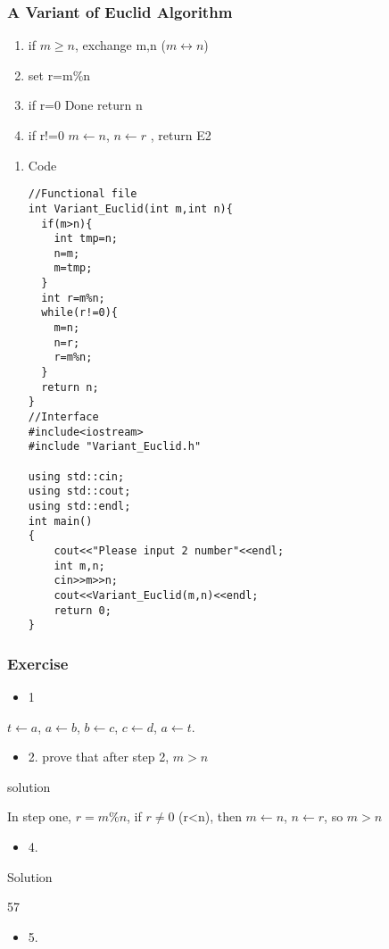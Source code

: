 \documentclass[11pt]{article}
\begin{document}
\subsubsection{A Variant of Euclid Algorithm}
\label{sec-1-1-2}
\begin{enumerate}
\item if $m\ge n$, exchange m,n ($m\leftrightarrow n$)
\item set r=m\%n
\item if r=0 Done return n
\item if r!=0 $m\leftarrow n$, $n\leftarrow r$ , return E2
\end{enumerate}
\begin{enumerate}
\item Code
\label{sec-1-1-2-1}
\begin{verbatim}
//Functional file
int Variant_Euclid(int m,int n){
  if(m>n){
    int tmp=n;
    n=m;
    m=tmp;
  }
  int r=m%n;
  while(r!=0){
    m=n;
    n=r;
    r=m%n;
  }
  return n;
}
//Interface
#include<iostream>
#include "Variant_Euclid.h"

using std::cin;
using std::cout;
using std::endl;
int main()
{
    cout<<"Please input 2 number"<<endl;
    int m,n;
    cin>>m>>n;
    cout<<Variant_Euclid(m,n)<<endl;
    return 0;
}
\end{verbatim}
\end{enumerate}

\subsubsection{Exercise}
\label{sec-1-1-3}
\begin{itemize}
\item 1
\end{itemize}
$t \leftarrow a$, $a \leftarrow b$, $b \leftarrow c$, $c \leftarrow d$, $a \leftarrow t$.
\begin{itemize}
\item 2. prove that after step 2, $m>n$
\end{itemize}

solution

In step one, $r=m\%n$, if $r\neq 0$ (r<n),
then $m\leftarrow n$,
$n\leftarrow r$,
so $m>n$
\begin{itemize}
\item 4.
\end{itemize}

Solution

57
\begin{itemize}
\item 5.
\end{itemize}
\end{document}
